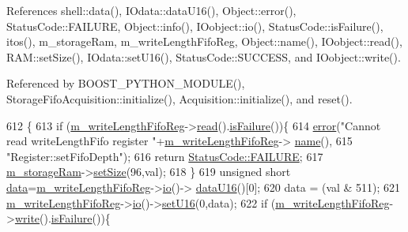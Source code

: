 References shell\+::data(), I\+Odata\+::data\+U16(), Object\+::error(), Status\+Code\+::\+F\+A\+I\+L\+U\+RE, Object\+::info(), I\+Oobject\+::io(), Status\+Code\+::is\+Failure(), itos(), m\+\_\+storage\+Ram, m\+\_\+write\+Length\+Fifo\+Reg, Object\+::name(), I\+Oobject\+::read(), R\+A\+M\+::set\+Size(), I\+Odata\+::set\+U16(), Status\+Code\+::\+S\+U\+C\+C\+E\+SS, and I\+Oobject\+::write().



Referenced by B\+O\+O\+S\+T\+\_\+\+P\+Y\+T\+H\+O\+N\+\_\+\+M\+O\+D\+U\+L\+E(), Storage\+Fifo\+Acquisition\+::initialize(), Acquisition\+::initialize(), and reset().


\begin{DoxyCode}
612                                              \{
613   \textcolor{keywordflow}{if} (\hyperlink{classA3PE_a9a0cb2253ea34c0be567a03684217fee}{m\_writeLengthFifoReg}->\hyperlink{classIOobject_aa07610c11963b1db6710e3c76ceea456}{read}().\hyperlink{classStatusCode_a5dd22dc6eb2c52fc4cabc58f6dea2eb7}{isFailure}())\{
614     \hyperlink{classObject_a204a95f57818c0f811933917a30eff45}{error}(\textcolor{stringliteral}{"Cannot read writeLengthFifo register "}+\hyperlink{classA3PE_a9a0cb2253ea34c0be567a03684217fee}{m\_writeLengthFifoReg}->
      \hyperlink{classObject_a300f4c05dd468c7bb8b3c968868443c1}{name}(),
615         \textcolor{stringliteral}{"Register::setFifoDepth"});
616     \textcolor{keywordflow}{return} \hyperlink{classStatusCode_a6f565cbeadc76d14c72f047e5e85eb4ba3da73d4c469762eb9d3c960368252b26}{StatusCode::FAILURE};
617     \hyperlink{classA3PE_a41e317474e0c6e63bad4648903279be9}{m\_storageRam}->\hyperlink{classRAM_adcf2ebb12f1a3e833ce7d5a33670c29d}{setSize}(96,val);
618   \}
619   \textcolor{keywordtype}{unsigned} \textcolor{keywordtype}{short} \hyperlink{namespaceshell_a5ea2525995cedc3efd69ea8a7f034d1e}{data}=\hyperlink{classA3PE_a9a0cb2253ea34c0be567a03684217fee}{m\_writeLengthFifoReg}->\hyperlink{classIOobject_af04fb94137c3d86849f478ac5afab5d1}{io}()->
      \hyperlink{classIOdata_a8d8528b731c6cf117f8c5b9b2473390c}{dataU16}()[0];
620   data = (val & 511);   
621   \hyperlink{classA3PE_a9a0cb2253ea34c0be567a03684217fee}{m\_writeLengthFifoReg}->\hyperlink{classIOobject_af04fb94137c3d86849f478ac5afab5d1}{io}()->\hyperlink{classIOdata_aa9ade5ce3944c8e2b831533b6f876caf}{setU16}(0,data);
622   \textcolor{keywordflow}{if} (\hyperlink{classA3PE_a9a0cb2253ea34c0be567a03684217fee}{m\_writeLengthFifoReg}->\hyperlink{classIOobject_a9f6984bc9f0fadcf800f1be2523ac744}{write}().\hyperlink{classStatusCode_a5dd22dc6eb2c52fc4cabc58f6dea2eb7}{isFailure}())\{

\end{DoxyCode}
